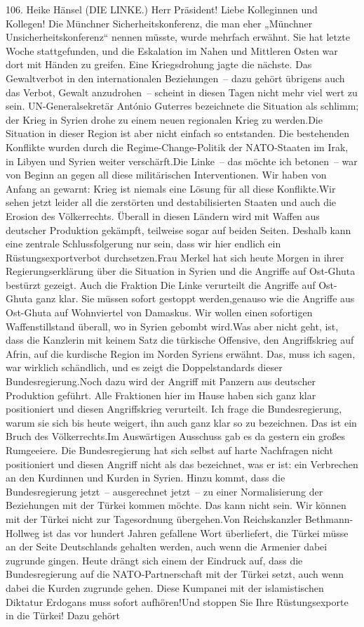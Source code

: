 \documentclass{article}
\begin{document}
	106. Heike Hänsel (DIE LINKE.) Herr Präsident! Liebe Kolleginnen und Kollegen! Die Münchner Sicherheitskonferenz, die man eher „Münchner Unsicherheitskonferenz“ nennen müsste, wurde mehrfach erwähnt. Sie hat letzte Woche stattgefunden, und die Eskalation im Nahen und Mittleren Osten war dort mit Händen zu greifen. Eine Kriegsdrohung jagte die nächste. Das Gewaltverbot in den internationalen Beziehungen – dazu gehört übrigens auch das Verbot, Gewalt anzudrohen – scheint in diesen Tagen nicht mehr viel wert zu sein. UN-Generalsekretär António Guterres bezeichnete die Situation als schlimm; der Krieg in Syrien drohe zu einem neuen regionalen Krieg zu werden.Die Situation in dieser Region ist aber nicht einfach so entstanden. Die bestehenden Konflikte wurden durch die Regime-Change-Politik der NATO-Staaten im Irak, in Libyen und Syrien weiter verschärft.Die Linke – das möchte ich betonen – war von Beginn an gegen all diese militärischen Interventionen. Wir haben von Anfang an gewarnt: Krieg ist niemals eine Lösung für all diese Konflikte.Wir sehen jetzt leider all die zerstörten und destabilisierten Staaten und auch die Erosion des Völkerrechts. Überall in diesen Ländern wird mit Waffen aus deutscher Produktion gekämpft, teilweise sogar auf beiden Seiten. Deshalb kann eine zentrale Schlussfolgerung nur sein, dass wir hier endlich ein Rüstungsexportverbot durchsetzen.Frau Merkel hat sich heute Morgen in ihrer Regierungserklärung über die Situation in Syrien und die Angriffe auf Ost-Ghuta bestürzt gezeigt. Auch die Fraktion Die Linke verurteilt die Angriffe auf Ost-Ghuta ganz klar. Sie müssen sofort gestoppt werden,genauso wie die Angriffe aus Ost-Ghuta auf Wohnviertel von Damaskus. Wir wollen einen sofortigen Waffenstillstand überall, wo in Syrien gebombt wird.Was aber nicht geht, ist, dass die Kanzlerin mit keinem Satz die türkische Offensive, den Angriffskrieg auf Afrin, auf die kurdische Region im Norden Syriens erwähnt. Das, muss ich sagen, war wirklich schändlich, und es zeigt die Doppelstandards dieser Bundesregierung.Noch dazu wird der Angriff mit Panzern aus deutscher Produktion geführt. Alle Fraktionen hier im Hause haben sich ganz klar positioniert und diesen Angriffskrieg verurteilt. Ich frage die Bundesregierung, warum sie sich bis heute weigert, ihn auch ganz klar so zu bezeichnen. Das ist ein Bruch des Völkerrechts.Im Auswärtigen Ausschuss gab es da gestern ein großes Rumgeeiere. Die Bundesregierung hat sich selbst auf harte Nachfragen nicht positioniert und diesen Angriff nicht als das bezeichnet, was er ist: ein Verbrechen an den Kurdinnen und Kurden in Syrien. Hinzu kommt, dass die Bundesregierung jetzt – ausgerechnet jetzt – zu einer Normalisierung der Beziehungen mit der Türkei kommen möchte. Das kann nicht sein. Wir können mit der Türkei nicht zur Tagesordnung übergehen.Von Reichskanzler Bethmann-Hollweg ist das vor hundert Jahren gefallene Wort überliefert, die Türkei müsse an der Seite Deutschlands gehalten werden, auch wenn die Armenier dabei zugrunde gingen. Heute drängt sich einem der Eindruck auf, dass die Bundesregierung auf die NATO-Partnerschaft mit der Türkei setzt, auch wenn dabei die Kurden zugrunde gehen. Diese Kumpanei mit der islamistischen Diktatur Erdogans muss sofort aufhören!Und stoppen Sie Ihre Rüstungsexporte in die Türkei! Dazu gehört 
\end{document}
